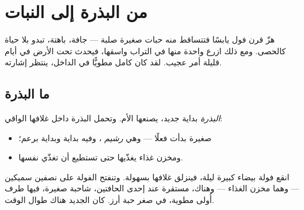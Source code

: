 \chapter{من البذرة إلى النبات}\label{ch:g2:from-seed-to-plant}

هزّ قرن فول يابسًا فتتساقط منه حبات صغيرة صلبة --- جافة، باهتة،
تبدو بلا حياة كالحصى. ومع ذلك ازرع واحدة منها في التراب واسقها،
فيحدث تحت الأرض في أيام قليلة أمر عجيب. لقد كان  كامل مطويًّا
في الداخل، ينتظر إشارته.

\section{ما البذرة}

\begin{definition}[البذرة]\label{def:g2:from-seed-to-plant:seed}
\emph{البذرة} بداية  جديد، يصنعها  الأم.
وتحمل البذرة داخل غلافها الواقي:
\begin{itemize}
  \item {} صغيرة بدأت فعلًا --- وهي \emph{رشيم}
        ، وفيه بداية  وبداية برعم؛
  \item ومخزن غذاء يغذّيها حتى تستطيع أن تغذّي نفسها.
\end{itemize}
\end{definition}

\begin{example}\label{ex:g2:from-seed-to-plant:open}
انقع فولة بيضاء كبيرة ليلة، فينزلق غلافها بسهولة. وتنفتح الفولة
على نصفين سميكين --- وهما مخزن الغذاء --- وهناك، مستقرة عند إحدى
الحافتين،  شاحبة صغيرة، فيها طرف   أُولى مطوية، في
صغر حبة أرز. كان  الجديد هناك طوال الوقت.
\end{example}

